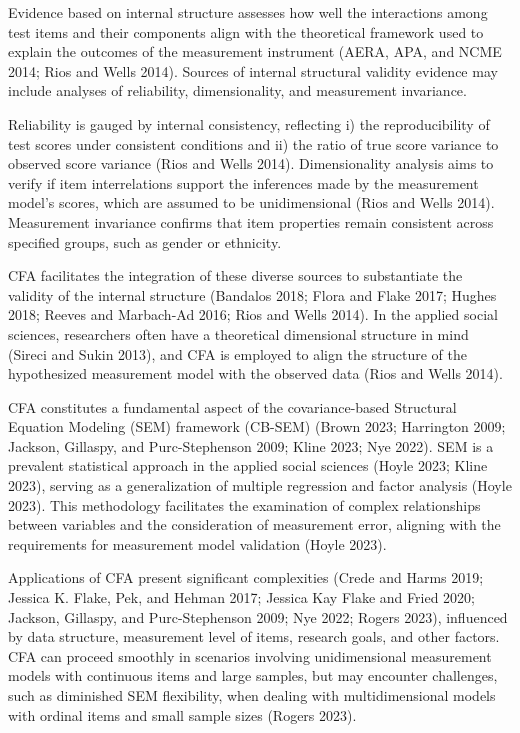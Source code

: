 \documentclass[
  a4paper,
]{article}
\begin{document}
Evidence based on internal structure assesses how well the interactions
among test items and their components align with the theoretical
framework used to explain the outcomes of the measurement instrument
(AERA, APA, and NCME 2014; Rios and Wells 2014). Sources of internal
structural validity evidence may include analyses of reliability,
dimensionality, and measurement invariance.

Reliability is gauged by internal consistency, reflecting i) the
reproducibility of test scores under consistent conditions and ii) the
ratio of true score variance to observed score variance (Rios and Wells
2014). Dimensionality analysis aims to verify if item interrelations
support the inferences made by the measurement model's scores, which are
assumed to be unidimensional (Rios and Wells 2014). Measurement
invariance confirms that item properties remain consistent across
specified groups, such as gender or ethnicity.

CFA facilitates the integration of these diverse sources to substantiate
the validity of the internal structure (Bandalos 2018; Flora and Flake
2017; Hughes 2018; Reeves and Marbach-Ad 2016; Rios and Wells 2014). In
the applied social sciences, researchers often have a theoretical
dimensional structure in mind (Sireci and Sukin 2013), and CFA is
employed to align the structure of the hypothesized measurement model
with the observed data (Rios and Wells 2014).

CFA constitutes a fundamental aspect of the covariance-based Structural
Equation Modeling (SEM) framework (CB-SEM) (Brown 2023; Harrington 2009;
Jackson, Gillaspy, and Purc-Stephenson 2009; Kline 2023; Nye 2022). SEM
is a prevalent statistical approach in the applied social sciences
(Hoyle 2023; Kline 2023), serving as a generalization of multiple
regression and factor analysis (Hoyle 2023). This methodology
facilitates the examination of complex relationships between variables
and the consideration of measurement error, aligning with the
requirements for measurement model validation (Hoyle 2023).

Applications of CFA present significant complexities (Crede and Harms
2019; Jessica K. Flake, Pek, and Hehman 2017; Jessica Kay Flake and
Fried 2020; Jackson, Gillaspy, and Purc-Stephenson 2009; Nye 2022;
Rogers 2023), influenced by data structure, measurement level of items,
research goals, and other factors. CFA can proceed smoothly in scenarios
involving unidimensional measurement models with continuous items and
large samples, but may encounter challenges, such as diminished SEM
flexibility, when dealing with multidimensional models with ordinal
items and small sample sizes (Rogers 2023).
\end{document}
